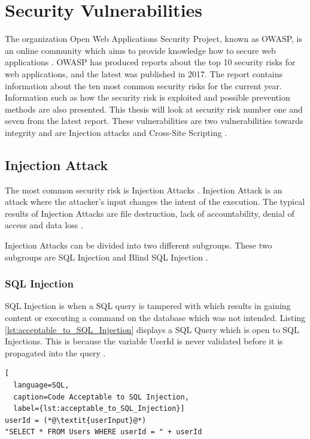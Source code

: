\section{Security Vulnerabilities}
\label{SecurityVulnerabilities}
The organization Open Web Applications Security Project, known as OWASP, is an online community which aims to provide knowledge how to secure web applications \parencite{OpenWebApplicationSecurityProject}. OWASP has produced reports about the top 10 security risks for web applications, and the latest was published in 2017. The report contains information about the ten most common security risks for the current year. Information such as how the security risk is exploited and possible prevention methods are also presented. This thesis will look at security risk number one and seven from the latest report. These vulnerabilities are two vulnerabilities towards integrity and are Injection attacks and Cross-Site Scripting \parencite{OWASP2017}.



\subsection{Injection Attack}
The most common security risk is Injection Attacks \parencite{OWASP2017}. Injection Attack is an attack where the attacker's input changes the intent of the execution. The typical results of Injection Attacks are file destruction, lack of accountability, denial of access and data loss \parencite{Secure_Web}.

Injection Attacks can be divided into two different subgroups. These two subgroups are SQL Injection and Blind SQL Injection \parencite{Secure_Web}.



\subsubsection{SQL Injection}
SQL Injection is when a SQL query is tampered with which results in gaining content or executing a command on the database which was not intended. Listing \ref{lst:acceptable_to_SQL_Injection} displays a SQL Query which is open to SQL Injections. This is because the variable UserId is never validated before it is propagated into the query \parencite{JustinClarke-Salt2009SIAa, Secure_Web}.

\hfill
\begin{lstlisting}[
  language=SQL,
  caption=Code Acceptable to SQL Injection,
  label={lst:acceptable_to_SQL_Injection}]
userId = (*@\textit{userInput}@*)
"SELECT * FROM Users WHERE userId = " + userId
\end{lstlisting}
\hfill

